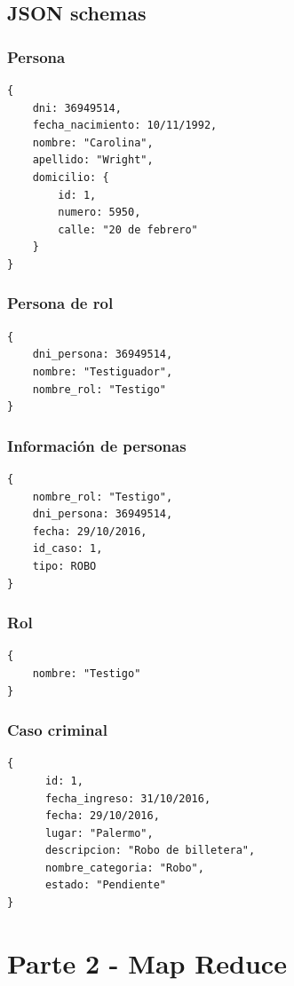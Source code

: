 \documentclass[10pt,a4paper]{article}
\begin{document}
\subsection{JSON schemas}

\subsubsection{Persona}
\begin{lstlisting}
{
	dni: 36949514,
	fecha_nacimiento: 10/11/1992,
	nombre: "Carolina",
	apellido: "Wright", 
	domicilio: {
		id: 1,
		numero: 5950,
		calle: "20 de febrero"
	}
}
\end{lstlisting}

\subsubsection{Persona de rol}
\begin{lstlisting}
{
	dni_persona: 36949514,
	nombre: "Testiguador",
	nombre_rol: "Testigo"
}
\end{lstlisting}

\subsubsection{Información de personas}
\begin{lstlisting}
{
	nombre_rol: "Testigo",
	dni_persona: 36949514,
	fecha: 29/10/2016,
	id_caso: 1, 
	tipo: ROBO
}
\end{lstlisting}

\subsubsection{Rol}
\begin{lstlisting}
{
	nombre: "Testigo"
}
\end{lstlisting}


\subsubsection{Caso criminal}
\begin{lstlisting}
{
	  id: 1,
	  fecha_ingreso: 31/10/2016,
	  fecha: 29/10/2016,
	  lugar: "Palermo",
	  descripcion: "Robo de billetera",
	  nombre_categoria: "Robo",
	  estado: "Pendiente"
}
\end{lstlisting}

\section{Parte 2 - Map Reduce}
\end{document}
